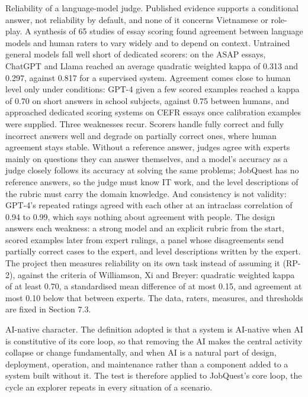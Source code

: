Reliability of a language-model judge. Published evidence supports a conditional answer, not reliability by default, and none of it concerns Vietnamese or role-play. A synthesis of 65 studies of essay scoring found agreement between language models and human raters to vary widely and to depend on context\cite{r101}. Untrained general models fall well short of dedicated scorers: on the ASAP essays, ChatGPT and Llama reached an average quadratic weighted kappa of 0.313 and 0.297, against 0.817 for a supervised system\cite{r125}. Agreement comes close to human level only under conditions: GPT-4 given a few scored examples reached a kappa of 0.70 on short answers in school subjects, against 0.75 between humans\cite{r102}, and approached dedicated scoring systems on CEFR essays once calibration examples were supplied\cite{r103}. Three weaknesses recur. Scorers handle fully correct and fully incorrect answers well and degrade on partially correct ones, where human agreement stays stable\cite{r126}. Without a reference answer, judges agree with experts mainly on questions they can answer themselves\cite{r127}, and a model's accuracy as a judge closely follows its accuracy at solving the same problems\cite{r60}; JobQuest has no reference answers, so the judge must know IT work, and the level descriptions of the rubric must carry the domain knowledge. And consistency is not validity: GPT-4's repeated ratings agreed with each other at an intraclass correlation of 0.94 to 0.99\cite{r105}, which says nothing about agreement with people. The design answers each weakness: a strong model and an explicit rubric from the start, scored examples later from expert rulings, a panel whose disagreements send partially correct cases to the expert, and level descriptions written by the expert. The project then measures reliability on its own task instead of assuming it (RP-2), against the criteria of Williamson, Xi and Breyer\cite{r71}: quadratic weighted kappa of at least 0.70, a standardised mean difference of at most 0.15, and agreement at most 0.10 below that between experts. The data, raters, measures, and thresholds are fixed in Section 7.3.

AI-native character. The definition adopted is that a system is AI-native when AI is constitutive of its core loop, so that removing the AI makes the central activity collapse or change fundamentally\cite{r130}, and when AI is a natural part of design, deployment, operation, and maintenance rather than a component added to a system built without it\cite{r131}. The test is therefore applied to JobQuest's core loop, the cycle an explorer repeats in every situation of a scenario.

